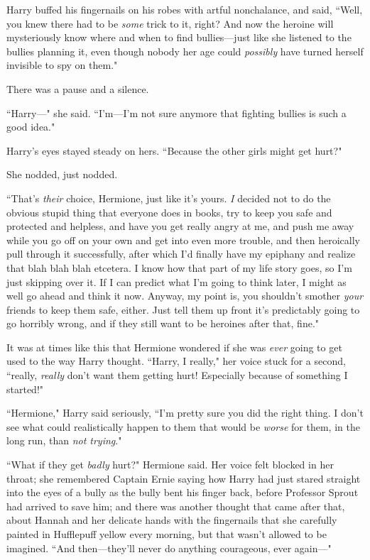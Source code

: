 Harry buffed his fingernails on his robes with artful nonchalance, and said, ``Well, you knew there had to be \emph{some} trick to it, right? And now the heroine will mysteriously know where and when to find bullies—just like she listened to the bullies planning it, even though nobody her age could \emph{possibly} have turned herself invisible to spy on them."

There was a pause and a silence.

``Harry—" she said. ``I'm—I'm not sure anymore that fighting bullies is such a good idea."

Harry's eyes stayed steady on hers. ``Because the other girls might get hurt?"

She nodded, just nodded.

``That's \emph{their} choice, Hermione, just like it's yours. \emph{I} decided not to do the obvious stupid thing that everyone does in books, try to keep you safe and protected and helpless, and have you get really angry at me, and push me away while you go off on your own and get into even more trouble, and then heroically pull through it successfully, after which I'd finally have my epiphany and realize that blah blah blah etcetera. I know how that part of my life story goes, so I'm just skipping over it. If I can predict what I'm going to think later, I might as well go ahead and think it now. Anyway, my point is, you shouldn't smother \emph{your} friends to keep them safe, either. Just tell them up front it's predictably going to go horribly wrong, and if they still want to be heroines after that, fine."

It was at times like this that Hermione wondered if she was \emph{ever} going to get used to the way Harry thought. ``Harry, I really," her voice stuck for a second, ``really, \emph{really} don't want them getting hurt! Especially because of something I started!"

``Hermione," Harry said seriously, ``I'm pretty sure you did the right thing. I don't see what could realistically happen to them that would be \emph{worse} for them, in the long run, than \emph{not trying}."

``What if they get \emph{badly} hurt?" Hermione said. Her voice felt blocked in her throat; she remembered Captain Ernie saying how Harry had just stared straight into the eyes of a bully as the bully bent his finger back, before Professor Sprout had arrived to save him; and there was another thought that came after that, about Hannah and her delicate hands with the fingernails that she carefully painted in Hufflepuff yellow every morning, but that wasn't allowed to be imagined. ``And then—they'll never do anything courageous, ever again—"

